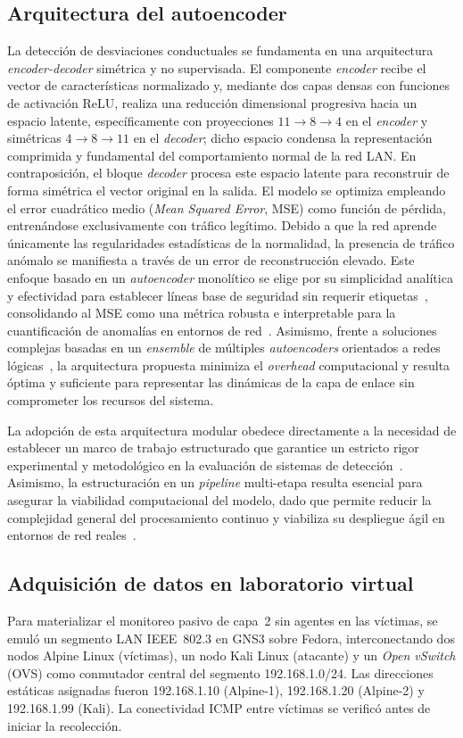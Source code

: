 \documentclass[conference]{IEEEtran}
\begin{document}
\subsection{Arquitectura del autoencoder}
La detección de desviaciones conductuales se fundamenta en una
arquitectura \textit{encoder-decoder} simétrica y no supervisada. El
componente \textit{encoder} recibe el vector de características
normalizado y, mediante dos capas densas con funciones de activación
ReLU, realiza una reducción dimensional progresiva hacia un espacio
latente, específicamente con proyecciones $11 \to 8 \to 4$ en el
\textit{encoder} y simétricas $4 \to 8 \to 11$ en el \textit{decoder};
dicho espacio condensa la representación comprimida y fundamental del
comportamiento normal de la red LAN. En contraposición, el bloque
\textit{decoder} procesa este espacio latente para reconstruir de forma
simétrica el vector original en la salida. El modelo se optimiza
empleando el error cuadrático medio (\textit{Mean Squared Error}, MSE)
como función de pérdida, entrenándose exclusivamente con tráfico
legítimo. Debido a que la red aprende únicamente las regularidades
estadísticas de la normalidad, la presencia de tráfico anómalo se
manifiesta a través de un error de reconstrucción elevado. Este enfoque
basado en un \textit{autoencoder} monolítico se elige por su simplicidad
analítica y efectividad para establecer líneas base de seguridad sin
requerir etiquetas~\cite{li2020}, consolidando al MSE como una métrica
robusta e interpretable para la cuantificación de anomalías en entornos
de red~\cite{song2021}. Asimismo, frente a soluciones complejas basadas
en un \textit{ensemble} de múltiples \textit{autoencoders} orientados a
redes lógicas~\cite{griffinyang2022}, la arquitectura propuesta minimiza
el \textit{overhead} computacional y resulta óptima y suficiente para
representar las dinámicas de la capa de enlace sin comprometer los
recursos del sistema.

La adopción de esta arquitectura modular obedece directamente a la
necesidad de establecer un marco de trabajo estructurado que garantice un
estricto rigor experimental y metodológico en la evaluación de sistemas
de detección~\cite{yang2022}. Asimismo, la estructuración en un
\textit{pipeline} multi-etapa resulta esencial para asegurar la
viabilidad computacional del modelo, dado que permite reducir la
complejidad general del procesamiento continuo y viabiliza su despliegue
ágil en entornos de red reales~\cite{injadat2021}.

\subsection{Adquisición de datos en laboratorio virtual}
Para materializar el monitoreo pasivo de capa~2 sin agentes en las
víctimas, se emuló un segmento LAN IEEE~802.3 en GNS3 sobre Fedora,
interconectando dos nodos Alpine Linux (víctimas), un nodo Kali Linux
(atacante) y un \textit{Open vSwitch} (OVS) como conmutador central del
segmento 192.168.1.0/24. Las direcciones estáticas asignadas
fueron 192.168.1.10 (Alpine-1), 192.168.1.20
(Alpine-2) y 192.168.1.99 (Kali). La conectividad ICMP entre
víctimas se verificó antes de iniciar la recolección.
\end{document}
